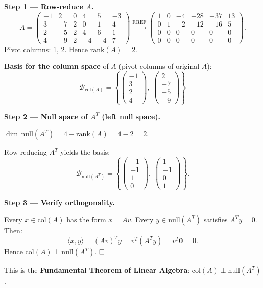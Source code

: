 \documentclass[12pt,a3paper]{article}
\begin{document}
\begin{tcolorbox}[enhanced,breakable,colback=cC!4,colframe=cC,
  boxrule=0.8pt,arc=5pt,
  title={\textbf{Answer}},
  fonttitle=\bfseries\color{white},colbacktitle=cC]

\textbf{Step 1 --- Row-reduce $A$.}
\[
A=\begin{pmatrix}
-1&2&0&4&5&-3\\3&-7&2&0&1&4\\2&-5&2&4&6&1\\4&-9&2&-4&-4&7
\end{pmatrix}
\xrightarrow{\text{RREF}}
\begin{pmatrix}
1&0&-4&-28&-37&13\\0&1&-2&-12&-16&5\\0&0&0&0&0&0\\0&0&0&0&0&0
\end{pmatrix}.
\]
Pivot columns: 1, 2. Hence $\mathrm{rank}(A)=2$.

\textbf{Basis for the column space} of $A$ (pivot columns of original $A$):
\[
\mathcal{B}_{\text{col}(A)} = \left\{
\begin{pmatrix}-1\\3\\2\\4\end{pmatrix},\;
\begin{pmatrix}2\\-7\\-5\\-9\end{pmatrix}
\right\}
\]

\medskip
\textbf{Step 2 --- Null space of $A^T$ (left null space).}

$\dim\,\mathrm{null}(A^T) = 4 - \mathrm{rank}(A) = 4 - 2 = 2$.

Row-reducing $A^T$ yields the basis:
\[
\mathcal{B}_{\mathrm{null}(A^T)} = \left\{
\begin{pmatrix}-1\\-1\\1\\0\end{pmatrix},\;
\begin{pmatrix}1\\-1\\0\\1\end{pmatrix}
\right\}.
\]

\medskip
\textbf{Step 3 --- Verify orthogonality.}

Every $x\in\mathrm{col}(A)$ has the form $x=Av$. Every $y\in\mathrm{null}(A^T)$ satisfies $A^Ty=0$. Then:
\[
\langle x,y\rangle = (Av)^Ty = v^T(A^Ty) = v^T\mathbf{0} = 0.
\]
Hence $\mathrm{col}(A)\perp\mathrm{null}(A^T)$. $\hfill\square$

This is the \textbf{Fundamental Theorem of Linear Algebra}: $\mathrm{col}(A)\perp\mathrm{null}(A^T)$.
\end{tcolorbox}
\end{document}
